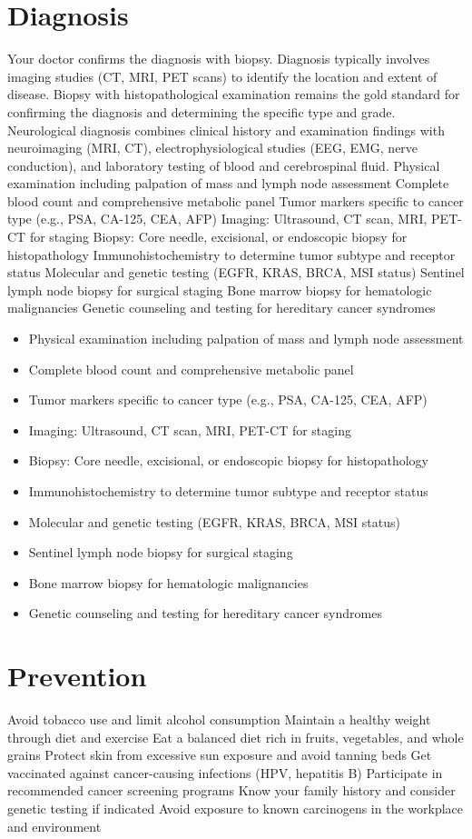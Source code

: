 \section{Diagnosis}
Your doctor confirms the diagnosis with biopsy. Diagnosis typically involves imaging studies (CT, MRI, PET scans) to identify the location and extent of disease. Biopsy with histopathological examination remains the gold standard for confirming the diagnosis and determining the specific type and grade. Neurological diagnosis combines clinical history and examination findings with neuroimaging (MRI, CT), electrophysiological studies (EEG, EMG, nerve conduction), and laboratory testing of blood and cerebrospinal fluid. Physical examination including palpation of mass and lymph node assessment Complete blood count and comprehensive metabolic panel Tumor markers specific to cancer type (e.g., PSA, CA-125, CEA, AFP) Imaging: Ultrasound, CT scan, MRI, PET-CT for staging Biopsy: Core needle, excisional, or endoscopic biopsy for histopathology Immunohistochemistry to determine tumor subtype and receptor status Molecular and genetic testing (EGFR, KRAS, BRCA, MSI status) Sentinel lymph node biopsy for surgical staging Bone marrow biopsy for hematologic malignancies Genetic counseling and testing for hereditary cancer syndromes

\begin{itemize}[noitemsep]
  \item Physical examination including palpation of mass and lymph node assessment
  \item Complete blood count and comprehensive metabolic panel
  \item Tumor markers specific to cancer type (e.g., PSA, CA-125, CEA, AFP)
  \item Imaging: Ultrasound, CT scan, MRI, PET-CT for staging
  \item Biopsy: Core needle, excisional, or endoscopic biopsy for histopathology
  \item Immunohistochemistry to determine tumor subtype and receptor status
  \item Molecular and genetic testing (EGFR, KRAS, BRCA, MSI status)
  \item Sentinel lymph node biopsy for surgical staging
  \item Bone marrow biopsy for hematologic malignancies
  \item Genetic counseling and testing for hereditary cancer syndromes
\end{itemize}
\section{Prevention}
Avoid tobacco use and limit alcohol consumption Maintain a healthy weight through diet and exercise Eat a balanced diet rich in fruits, vegetables, and whole grains Protect skin from excessive sun exposure and avoid tanning beds Get vaccinated against cancer-causing infections (HPV, hepatitis B) Participate in recommended cancer screening programs Know your family history and consider genetic testing if indicated Avoid exposure to known carcinogens in the workplace and environment

